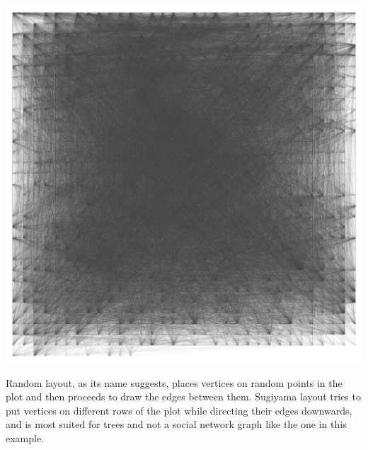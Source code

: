 \documentclass[12pt, a4paper]{article}
\begin{document}
\begin{multicols}{2}
{  \includegraphics[width=\columnwidth]{src/youtube/hdg/comp/4_plot_frgrid}\\
  \label{fig:hdg_c4}}
\end{multicols}

Random layout, as its name suggests, places vertices on random points in the plot and then proceeds to draw the edges between them. Sugiyama layout tries to put vertices on different rows of the plot while directing their edges downwards, and is most suited for trees and not a social network graph like the one in this example.
\end{document}
